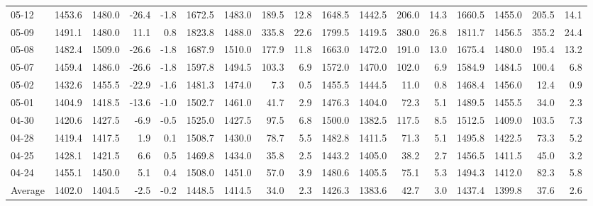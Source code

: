 \begin{threeparttable}
{\begin{tabular}{lrrrrrrrrrrrrrrrr}
  05-12 & 1453.6 & 1480.0 &      -26.4 &           -1.8 & 1672.5 & 1483.0 &      189.5 &           12.8 & 1648.5 & 1442.5 &      206.0 &           14.3 & 1660.5 & 1455.0 &       205.5 &             14.1 \\
  05-09 & 1491.1 & 1480.0 &       11.1 &            0.8 & 1823.8 & 1488.0 &      335.8 &           22.6 & 1799.5 & 1419.5 &      380.0 &           26.8 & 1811.7 & 1456.5 &       355.2 &             24.4 \\
  05-08 & 1482.4 & 1509.0 &      -26.6 &           -1.8 & 1687.9 & 1510.0 &      177.9 &           11.8 & 1663.0 & 1472.0 &      191.0 &           13.0 & 1675.4 & 1480.0 &       195.4 &             13.2 \\
  05-07 & 1459.4 & 1486.0 &      -26.6 &           -1.8 & 1597.8 & 1494.5 &      103.3 &            6.9 & 1572.0 & 1470.0 &      102.0 &            6.9 & 1584.9 & 1484.5 &       100.4 &              6.8 \\
  05-02 & 1432.6 & 1455.5 &      -22.9 &           -1.6 & 1481.3 & 1474.0 &        7.3 &            0.5 & 1455.5 & 1444.5 &       11.0 &            0.8 & 1468.4 & 1456.0 &        12.4 &              0.9 \\
  05-01 & 1404.9 & 1418.5 &      -13.6 &           -1.0 & 1502.7 & 1461.0 &       41.7 &            2.9 & 1476.3 & 1404.0 &       72.3 &            5.1 & 1489.5 & 1455.5 &        34.0 &              2.3 \\
  04-30 & 1420.6 & 1427.5 &       -6.9 &           -0.5 & 1525.0 & 1427.5 &       97.5 &            6.8 & 1500.0 & 1382.5 &      117.5 &            8.5 & 1512.5 & 1409.0 &       103.5 &              7.3 \\
  04-28 & 1419.4 & 1417.5 &        1.9 &            0.1 & 1508.7 & 1430.0 &       78.7 &            5.5 & 1482.8 & 1411.5 &       71.3 &            5.1 & 1495.8 & 1422.5 &        73.3 &              5.2 \\
  04-25 & 1428.1 & 1421.5 &        6.6 &            0.5 & 1469.8 & 1434.0 &       35.8 &            2.5 & 1443.2 & 1405.0 &       38.2 &            2.7 & 1456.5 & 1411.5 &        45.0 &              3.2 \\
  04-24 & 1455.1 & 1450.0 &        5.1 &            0.4 & 1508.0 & 1451.0 &       57.0 &            3.9 & 1480.6 & 1405.5 &       75.1 &            5.3 & 1494.3 & 1412.0 &        82.3 &              5.8 \\
Average & 1402.0 & 1404.5 &       -2.5 &           -0.2 & 1448.5 & 1414.5 &       34.0 &            2.3 & 1426.3 & 1383.6 &       42.7 &            3.0 & 1437.4 & 1399.8 &        37.6 &              2.6 \\

\end{tabular}}
\end{threeparttable}
